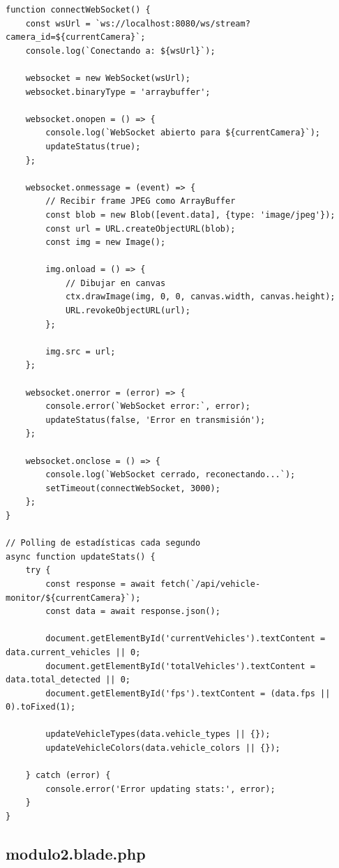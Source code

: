 \documentclass[12pt,a4paper]{article}
\begin{document}
\begin{lstlisting}[caption={modulo1 - Conexión WebSocket}, style=jsstyle, label=lst:modulo1-ws]
function connectWebSocket() {
    const wsUrl = `ws://localhost:8080/ws/stream?camera_id=${currentCamera}`;
    console.log(`Conectando a: ${wsUrl}`);
    
    websocket = new WebSocket(wsUrl);
    websocket.binaryType = 'arraybuffer';

    websocket.onopen = () => {
        console.log(`WebSocket abierto para ${currentCamera}`);
        updateStatus(true);
    };

    websocket.onmessage = (event) => {
        // Recibir frame JPEG como ArrayBuffer
        const blob = new Blob([event.data], {type: 'image/jpeg'});
        const url = URL.createObjectURL(blob);
        const img = new Image();

        img.onload = () => {
            // Dibujar en canvas
            ctx.drawImage(img, 0, 0, canvas.width, canvas.height);
            URL.revokeObjectURL(url);
        };

        img.src = url;
    };

    websocket.onerror = (error) => {
        console.error(`WebSocket error:`, error);
        updateStatus(false, 'Error en transmisión');
    };

    websocket.onclose = () => {
        console.log(`WebSocket cerrado, reconectando...`);
        setTimeout(connectWebSocket, 3000);
    };
}

// Polling de estadísticas cada segundo
async function updateStats() {
    try {
        const response = await fetch(`/api/vehicle-monitor/${currentCamera}`);
        const data = await response.json();

        document.getElementById('currentVehicles').textContent = data.current_vehicles || 0;
        document.getElementById('totalVehicles').textContent = data.total_detected || 0;
        document.getElementById('fps').textContent = (data.fps || 0).toFixed(1);
        
        updateVehicleTypes(data.vehicle_types || {});
        updateVehicleColors(data.vehicle_colors || {});

    } catch (error) {
        console.error('Error updating stats:', error);
    }
}
\end{lstlisting}

\subsection{modulo2.blade.php}
\end{document}
